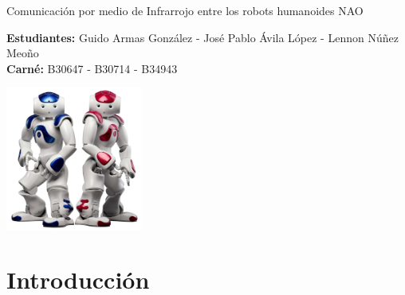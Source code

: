 \documentclass[letterpaper]{article}
\begin{document}
\vspace*{2cm}

\begin{center}
\Huge
Comunicación por medio de Infrarrojo entre los robots humanoides NAO
\vspace*{1cm}
\end{center}

\noindent
\small\baselineskip=14pt
\textbf{Estudiantes:} Guido Armas González - José Pablo Ávila López - Lennon Núñez Meoño\\
\textbf{Carné:} B30647 - B30714 - B34943\\

\begin{center}
\includegraphics[width=4.5cm]{pictures/nao1.jpg}

\end{center}


\section{Introducción}
\end{document}
